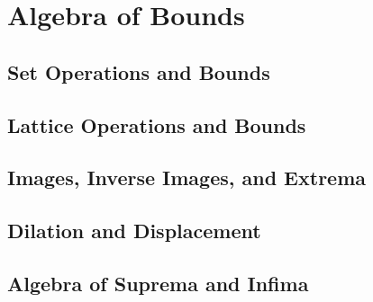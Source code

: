 \section{Algebra of Bounds}

\subsection{Set Operations and Bounds}


\subsection{Lattice Operations and Bounds}


\subsection{Images, Inverse Images, and Extrema}


\subsection{Dilation and Displacement}


\subsection{Algebra of Suprema and Infima}

